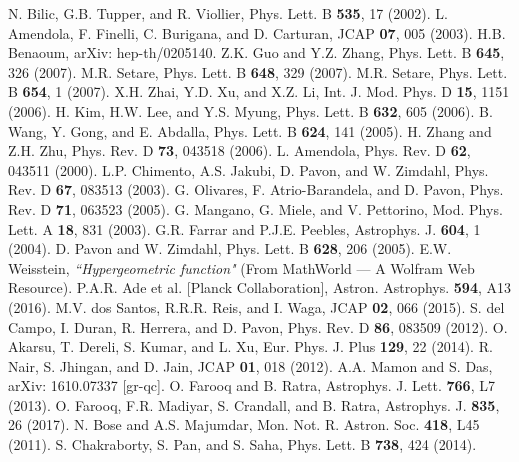 \documentclass[two-column, nofootinbib]{revtex4-1}
\begin{document}
\begin{thebibliography}{150}
 N. Bilic, G.B. Tupper, and R. Viollier, {\color{magenta} Phys. Lett. B {\bf 535}, 17 (2002)}.
 L. Amendola, F. Finelli, C. Burigana, and D. Carturan, {\color{magenta} JCAP {\bf 07}, 005 (2003)}.
 H.B. Benaoum, arXiv: hep-th/0205140.
 Z.K. Guo and Y.Z. Zhang, {\color{magenta} Phys. Lett. B {\bf 645}, 326 (2007)}.
 M.R. Setare, {\color{magenta} Phys. Lett. B {\bf 648}, 329 (2007)}.
 M.R. Setare, {\color{magenta} Phys. Lett. B {\bf 654}, 1 (2007)}.
 X.H. Zhai, Y.D. Xu, and X.Z. Li, {\color{magenta} Int. J. Mod. Phys. D {\bf 15}, 1151 (2006)}.
 H. Kim, H.W. Lee, and Y.S. Myung, {\color{magenta} Phys. Lett. B {\bf 632}, 605 (2006)}.
 B. Wang, Y. Gong, and E. Abdalla, {\color{magenta} Phys. Lett. B {\bf 624}, 141 (2005)}.
 H. Zhang and Z.H. Zhu, {\color{magenta} Phys. Rev. D {\bf 73}, 043518 (2006)}.
 L. Amendola, {\color{magenta} Phys. Rev. D {\bf 62}, 043511 (2000)}.
 L.P. Chimento, A.S. Jakubi, D. Pavon, and W. Zimdahl, {\color{magenta} Phys. Rev. D {\bf 67}, 083513 (2003)}.
 G. Olivares, F. Atrio-Barandela, and D. Pavon, {\color{magenta} Phys. Rev. D {\bf 71}, 063523 (2005)}.
  G. Mangano, G. Miele, and V. Pettorino, {\color{magenta} Mod. Phys. Lett. A {\bf 18}, 831 (2003)}.
  G.R. Farrar and P.J.E. Peebles, {\color{magenta} Astrophys. J. {\bf 604}, 1 (2004)}.
 D. Pavon and W. Zimdahl, {\color{magenta} Phys. Lett. B {\bf 628}, 206 (2005)}.
 E.W. Weisstein, {\it ``Hypergeometric function"} (From MathWorld --- A Wolfram Web Resource).
 P.A.R. Ade et al. [Planck Collaboration], {\color{magenta} Astron. Astrophys. {\bf 594}, A13 (2016)}.
 M.V. dos Santos, R.R.R. Reis, and I. Waga, {\color{magenta} JCAP {\bf 02}, 066 (2015)}.
 S. del Campo, I. Duran, R. Herrera, and D. Pavon, {\color{magenta} Phys. Rev. D {\bf 86}, 083509 (2012)}.
 O. Akarsu, T. Dereli, S. Kumar, and L. Xu, {\color{magenta} Eur. Phys. J. Plus {\bf 129}, 22 (2014)}.
 R. Nair, S. Jhingan, and D. Jain, {\color{magenta} JCAP {\bf 01}, 018 (2012)}.
 A.A. Mamon and S. Das, arXiv: 1610.07337 [gr-qc].
 O. Farooq and B. Ratra, {\color{magenta} Astrophys. J. Lett. {\bf 766}, L7 (2013)}.
 O. Farooq, F.R. Madiyar, S. Crandall, and B. Ratra, {\color{magenta} Astrophys. J. {\bf 835}, 26 (2017)}.
 N. Bose and A.S. Majumdar, {\color{magenta} Mon. Not. R. Astron. Soc. {\bf 418}, L45 (2011)}.
 S. Chakraborty, S. Pan, and S. Saha, {\color{magenta} Phys. Lett. B {\bf 738}, 424 (2014)}.






\end{thebibliography}
\end{document}
